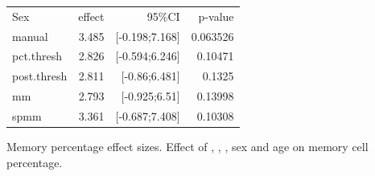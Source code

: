 \begin{table}[h]
\begin{tabular}{lrrr}
\rowcolor{Gray}
Sex              & effect & 95\%CI         & p-value\\
manual           & 3.485  & [-0.198;7.168] & 0.063526\\
pct.thresh       & 2.826  & [-0.594;6.246] & 0.10471\\
post.thresh      & 2.811  & [-0.86;6.481]  & 0.1325\\
mm               & 2.793  & [-0.925;6.51]  & 0.13998\\
spmm             & 3.361  & [-0.687;7.408] & 0.10308\\
\end{tabular} 
{Memory percentage effect sizes.}
{
Effect of , , , sex and age on memory cell percentage.
}
\end{table}


